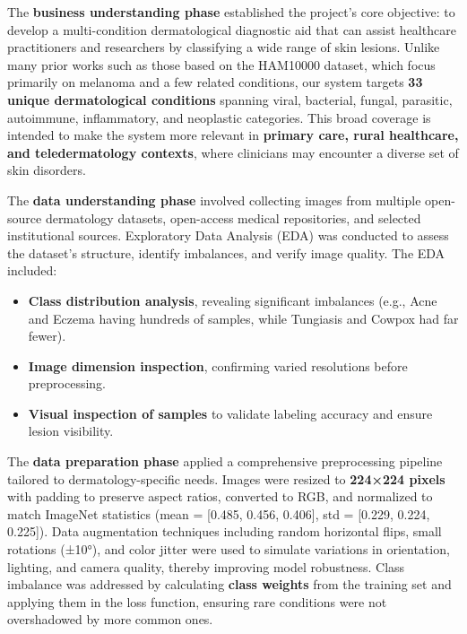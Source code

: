 \documentclass[
  12pt,
  oneside]{article}
\providecommand{\tightlist}{%
  \setlength{\itemsep}{0pt}\setlength{\parskip}{0pt}}
\begin{document}
The \textbf{business understanding phase} established the project's core
objective: to develop a multi-condition dermatological diagnostic aid
that can assist healthcare practitioners and researchers by classifying
a wide range of skin lesions. Unlike many prior works such as those
based on the HAM10000 dataset, which focus primarily on melanoma and a
few related conditions, our system targets \textbf{33 unique
dermatological conditions} spanning viral, bacterial, fungal, parasitic,
autoimmune, inflammatory, and neoplastic categories. This broad coverage
is intended to make the system more relevant in \textbf{primary care,
rural healthcare, and teledermatology contexts}, where clinicians may
encounter a diverse set of skin disorders.

The \textbf{data understanding phase} involved collecting images from
multiple open-source dermatology datasets, open-access medical
repositories, and selected institutional sources. Exploratory Data
Analysis (EDA) was conducted to assess the dataset's structure, identify
imbalances, and verify image quality. The EDA included:

\begin{itemize}
\tightlist
\item
  \textbf{Class distribution analysis}, revealing significant imbalances
  (e.g., Acne and Eczema having hundreds of samples, while Tungiasis and
  Cowpox had far fewer).
\item
  \textbf{Image dimension inspection}, confirming varied resolutions
  before preprocessing.
\item
  \textbf{Visual inspection of samples} to validate labeling accuracy
  and ensure lesion visibility.
\end{itemize}

The \textbf{data preparation phase} applied a comprehensive
preprocessing pipeline tailored to dermatology-specific needs. Images
were resized to \textbf{224×224 pixels} with padding to preserve aspect
ratios, converted to RGB, and normalized to match ImageNet statistics
(mean = {[}0.485, 0.456, 0.406{]}, std = {[}0.229, 0.224, 0.225{]}).
Data augmentation techniques including random horizontal flips, small
rotations (±10°), and color jitter were used to simulate variations in
orientation, lighting, and camera quality, thereby improving model
robustness. Class imbalance was addressed by calculating \textbf{class
weights} from the training set and applying them in the loss function,
ensuring rare conditions were not overshadowed by more common ones.
\end{document}
